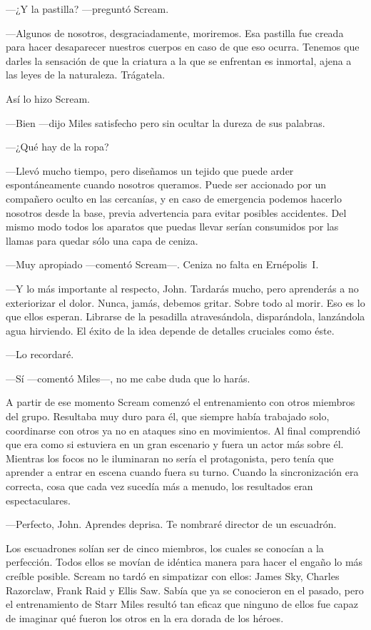 ---¿Y la pastilla? ---preguntó Scream.

---Algunos de nosotros, desgraciadamente, moriremos. Esa pastilla fue creada para hacer desaparecer nuestros cuerpos en caso de que eso ocurra. Tenemos que darles la sensación de que la criatura a la que se enfrentan es inmortal, ajena a las leyes de la naturaleza. Trágatela.

Así lo hizo Scream.

---Bien ---dijo Miles satisfecho pero sin ocultar la dureza de sus palabras.

---¿Qué hay de la ropa?

---Llevó mucho tiempo, pero diseñamos un tejido que puede arder espontáneamente cuando nosotros queramos. Puede ser accionado por un compañero oculto en las cercanías, y en caso de emergencia podemos hacerlo nosotros desde la base, previa advertencia para evitar posibles accidentes. Del mismo modo todos los aparatos que puedas llevar serían consumidos por las llamas para quedar sólo una capa de ceniza.

---Muy apropiado ---comentó Scream---. Ceniza no falta en Ernépolis~I.

---Y lo más importante al respecto, John. Tardarás mucho, pero aprenderás a no exteriorizar el dolor. Nunca, jamás, debemos gritar. Sobre todo al morir. Eso es lo que ellos esperan. Librarse de la pesadilla atravesándola, disparándola, lanzándola agua hirviendo. El éxito de la idea depende de detalles cruciales como éste.

---Lo recordaré.

---Sí ---comentó Miles---, no me cabe duda que lo harás.

A partir de ese momento Scream comenzó el entrenamiento con otros miembros del grupo. Resultaba muy duro para él, que siempre había trabajado solo, coordinarse con otros ya no en ataques sino en movimientos. Al final comprendió que era como si estuviera en un gran escenario y fuera un actor más sobre él. Mientras los focos no le iluminaran no sería el protagonista, pero tenía que aprender a entrar en escena cuando fuera su turno. Cuando la sincronización era correcta, cosa que cada vez sucedía más a menudo, los resultados eran espectaculares.

---Perfecto, John. Aprendes deprisa. Te nombraré director de un escuadrón.

Los escuadrones solían ser de cinco miembros, los cuales se conocían a la perfección. Todos ellos se movían de idéntica manera para hacer el engaño lo más creíble posible. Scream no tardó en simpatizar con ellos: James Sky, Charles Razorclaw, Frank Raid y Ellis Saw. Sabía que ya se conocieron en el pasado, pero el entrenamiento de Starr Miles resultó tan eficaz que ninguno de ellos fue capaz de imaginar qué fueron los otros en la era dorada de los héroes.

